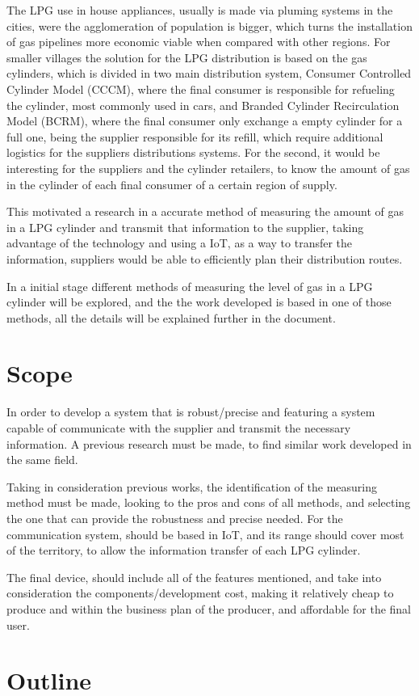 The LPG use in house appliances, usually is made via pluming systems in the cities, were the agglomeration of population is bigger, which turns the installation of gas pipelines more economic viable when compared with other regions. For smaller villages the solution for the LPG distribution is based on the gas cylinders, which is divided in two main distribution system, Consumer Controlled Cylinder Model (CCCM), where the final consumer is responsible for refueling the cylinder, most commonly used in cars, and Branded Cylinder Recirculation Model (BCRM), where the final consumer only exchange a empty cylinder for a full one, being the supplier responsible for its refill, which require additional logistics for the suppliers distributions systems. For the second, it would be interesting for the suppliers and the cylinder retailers, to know the amount of gas in the cylinder of each final consumer of a certain region of supply.

This motivated a research in a accurate method of measuring the amount of gas in a LPG cylinder and transmit that information to the supplier, taking advantage of the technology and using a IoT, as a way to transfer the information, suppliers would be able to efficiently plan their distribution routes. 

In a initial stage different methods of measuring the level of gas in a LPG cylinder will be explored, and the the work developed is based in one of those methods, all the details will be explained further in the document.

\section{Scope}

In order to develop a system that is robust/precise and featuring a system capable of communicate with the supplier and transmit the necessary information. A previous research must be made, to find similar work developed in the same field.

Taking in consideration previous works, the identification of the measuring method must be made, looking to the pros and cons of all methods, and selecting the one that can provide the robustness and precise needed. For the communication system, should be based in IoT, and its range should cover most of the territory, to allow the information transfer of each LPG cylinder.

The final device, should include all of the features mentioned, and take into consideration the components/development cost, making it relatively cheap to produce and within the business plan of the producer, and affordable for the final user.

\section{Outline}

\clearpage
\printbibliography[heading=subbibliography]
